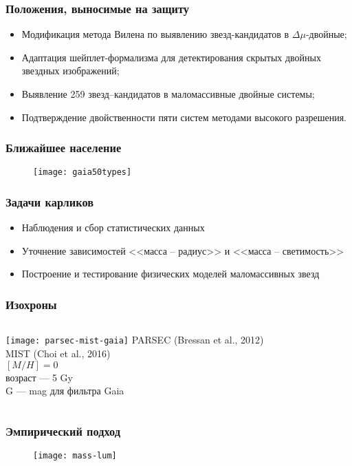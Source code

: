 \begin{frame}
    \frametitle{Положения, выносимые на защиту}
    \begin{itemize}
  		\item Модификация метода Вилена по выявлению звезд-кандидатов в $\Delta\mu$-двойные;
  		\item Адаптация шейплет-формализма для детектирования скрытых двойных звездных изображений;
  		\item Выявление 259 звезд--кандидатов в маломассивные двойные системы;
  		\item Подтверждение двойственности пяти систем методами высокого разрешения.
    \end{itemize}
\end{frame}

\begin{frame}
\frametitle{Ближайшее население}
\begin{figure}[pt]
  \centering
   \texttt{[image: gaia50types]}
\end{figure}
\end{frame}

\begin{frame}
\frametitle{Задачи карликов}
\begin{itemize}
  \item Наблюдения и сбор статистических данных
  \item Уточнение зависимостей <<масса -- радиус>> и <<масса -- светимость>>
  \item Построение и тестирование физических моделей маломассивных звезд
\end{itemize}
\end{frame}

\begin{frame}
\frametitle{Изохроны}
\begin{columns}
	\texttt{[image: parsec-mist-gaia]}
 {\scriptsize PARSEC (Bressan et al., 2012)} \\
 {\scriptsize MIST (Choi et al., 2016)} \\
 {\scriptsize $[M/H]=0$} \\
 {\scriptsize возраст --- 5 Gy} \\
 {\scriptsize G --- mag для фильтра Gaia} \\
\end{columns}
\end{frame}

\begin{frame}
\frametitle{Эмпирический подход}
\begin{figure}[pt]
  \centering
  \texttt{[image: mass-lum]}
\end{figure}
\end{frame}

